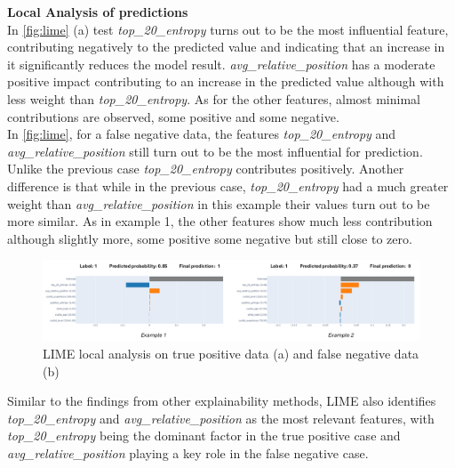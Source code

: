 \noindent
\textbf{Local Analysis of predictions}\\
In \autoref{fig:lime} (a) test \textit{top\_20\_entropy} turns out to be the most influential feature, contributing negatively to the predicted value and indicating that an increase in it significantly reduces the model result. \textit{avg\_relative\_position} has a moderate positive impact contributing to an increase in the predicted value although with less weight than \textit{top\_20\_entropy}. As for the other features, almost minimal contributions are observed, some positive and some negative. \\
In \autoref{fig:lime}, for a false negative data, the features \textit{top\_20\_entropy} and \textit{avg\_relative\_position} still turn out to be the most influential for prediction. Unlike the previous case \textit{top\_20\_entropy} contributes positively. Another difference is that while in the previous case, \textit{top\_20\_entropy} had a much greater weight than \textit{avg\_relative\_position} in this example their values turn out to be more similar. As in example 1, the other features show much less contribution although slightly more, some positive some negative but still close to zero.

\begin{figure}[H]
    \centering
    \includegraphics[width=1\linewidth]{images//XAI/LIME.png}
    \caption{\small LIME local analysis on true positive data (a) and false negative data (b)}
    \label{fig:lime}
\end{figure}

Similar to the findings from other explainability methods, LIME also identifies \textit{top\_20\_entropy} and \textit{avg\_relative\_position} as the most relevant features, with \textit{top\_20\_entropy} being the dominant factor in the true positive case and \textit{avg\_relative\_position} playing a key role in the false negative case.